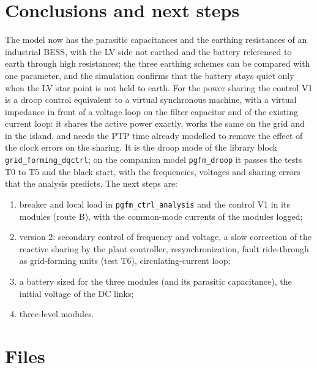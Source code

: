 \documentclass[11pt,a4paper]{scrartcl}
\newcommand{\code}[1]{\texttt{#1}}
\begin{document}
\begin{onehalfspace}
\section{Conclusions and next steps}
\label{sec:conclusions}

The model now has the parasitic capacitances and the earthing resistances of an industrial BESS, with the LV side not earthed and the battery referenced to earth through high resistances; the three earthing schemes can be compared with one parameter, and the simulation confirms that the battery stays quiet only when the LV star point is not held to earth. For the power sharing the control V1 is a droop control equivalent to a virtual synchronous machine, with a virtual impedance in front of a voltage loop on the filter capacitor and of the existing current loop: it shares the active power exactly, works the same on the grid and in the island, and needs the PTP time already modelled to remove the effect of the clock errors on the sharing. It is the droop mode of the library block \code{grid\_forming\_dqctrl}; on the companion model \code{pgfm\_droop} it passes the tests T0 to T5 and the black start, with the frequencies, voltages and sharing errors that the analysis predicts. The next steps are:

\begin{enumerate}[nosep]
	\item breaker and local load in \code{pgfm\_ctrl\_analysis} and the control V1 in its modules (route B), with the common-mode currents of the modules logged;
	\item version 2: secondary control of frequency and voltage, a slow correction of the reactive sharing by the plant controller, resynchronization, fault ride-through as grid-forming units (test T6), circulating-current loop;
	\item a battery sized for the three modules (and its parasitic capacitance), the initial voltage of the DC links;
	\item three-level modules.
\end{enumerate}

\appendix
\section{Files}
\label{sec:files}


\end{onehalfspace}
\end{document}
